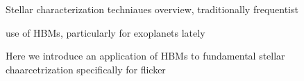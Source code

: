 
Stellar characterization techniaues overview, traditionally frequentist

use of HBMs, particularly for exoplanets lately

Here we introduce an application of HBMs to fundamental stellar chaarcetrization
specifically for flicker
